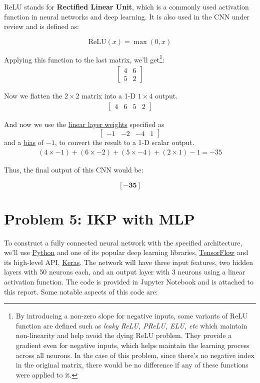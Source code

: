 \documentclass[conference]{IEEEtran}
\begin{document}
ReLU stands for \textbf{Rectified Linear Unit}, which is a commonly used activation function in neural networks and deep learning. It is also used in the CNN under review and is defined as:

\begin{equation}
    \text{ReLU}(x) = \max(0, x)
\end{equation}

Applying this function to the last matrix, we'll get\footnote{By introducing a non-zero slope for negative inputs, some variants of ReLU function are defined such as \textit{leaky ReLU, PReLU, ELU, etc} which maintain non-linearity and help avoid the dying ReLU problem. They provide a gradient even for negative inputs, which helps maintain the learning process across all neurons. In the case of this problem, since there's no negative index in the original matrix, there would be no difference if any of these functions were applied to it.}:
\begin{align}
    \begin{bmatrix}
        4 & 6 \\
        5 & 2
    \end{bmatrix}
\end{align}

Now we flatten the $2\times2$ matrix into a 1-D $1\times4$ output.
\begin{align}
    \begin{bmatrix}
        4 & 6 & 5 & 2
    \end{bmatrix}
\end{align}

And now we use the \underline{linear layer weights} specified as
$$ \begin{bmatrix}
        -1 & -2 & -4 & 1
    \end{bmatrix} $$
and a \underline{bias} of $-1$, to convert the result to a 1-D scalar output.
\begin{align*}
    (4\times-1) + (6\times-2) + (5\times-4) + (2\times1) - 1 = - 35
\end{align*}

Thus, the final output of this CNN would be:
\begin{Large}
    $$\mathbf{[-35]}$$
\end{Large}
\vspace{14px}

\section{Problem 5: IKP with MLP}
To construct a fully connected neural network with the specified architecture, we'll use \underline{Python} and one of its popular deep learning libraries, \underline{TensorFlow} and its high-level API, \underline{Keras}. The network will have three input features, two hidden layers with 50 neurons each, and an output layer with 3 neurons using a linear activation function. The code is provided in Jupyter Notebook and is attached to this report. Some notable aspects of this code are:
\end{document}

